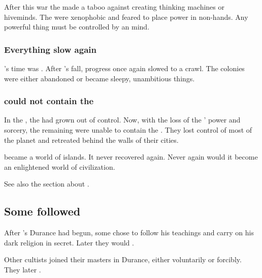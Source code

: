 After this war the \ophidians made a taboo against creating thinking machines or hiveminds.
The \ophidians were xenophobic and feared to place power in non-\ophidian hands.
Any powerful thing must be controlled by an \ophidian mind.





\subsubsection{Everything slow again}
\Sethicus's time was . 
After \Sethicus's fall, \ophidian progress once again slowed to a crawl. 
The colonies were either abandoned or became sleepy, unambitious things. 





\subsubsection{\Ophidians could not contain the \wylde}
In the , the \wylde had grown out of control.
Now, with the loss of the \dragons' power and sorcery, the remaining \ophidians were unable to contain the \wylde.
They lost control of most of the planet and retreated behind the walls of their cities.

\Miith became a world of islands.
It never recovered again.
Never again would it become an enlightened world of civilization. 

See also the section about .









\subsection{Some \ophidians followed \Sethicus}
After \Sethicus's Durance had begun, some \ophidians chose to follow his teachings and carry on his dark religion in secret. 
Later they would . 

Other \Sethican cultists joined their \draconian masters in Durance, either voluntarily or forcibly. 
They later . 





